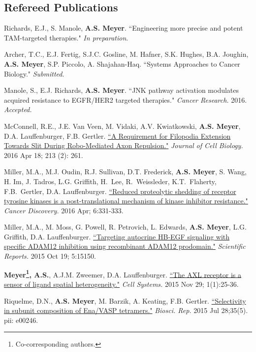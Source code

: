 \documentclass[11pt]{res}
\begin{document}
\begin{resume}
\section{Refereed Publications}
{ \leftskip 0.1in
\parindent -0.1in

Richards, E.J., S. Manole, {\bf A.S. Meyer}. ``Engineering more precise and potent TAM-targeted therapies." {\sl In preparation}.

\parskip 0.1in

Archer, T.C., E.J. Fertig, S.J.C. Gosline, M. Hafner, S.K. Hughes, B.A. Joughin, {\bf A.S. Meyer}, S.P. Piccolo, A. Shajahan-Haq. ``Systems Approaches to Cancer Biology." {\sl Submitted}.

Manole, S., E.J. Richards, {\bf A.S. Meyer}. ``JNK pathway activation modulates acquired resistance to EGFR/HER2 targeted therapies." {\sl Cancer Research.} 2016. {\sl Accepted.}

McConnell, R.E., J.E. Van Veen, M. Vidaki, A.V. Kwiatkowski, {\bf A.S. Meyer}, D.A. Lauffenburger, F.B. Gertler. \href{http://jcb.rupress.org/content/213/2/261.full}{``A Requirement for Filopodia Extension Towards Slit During Robo-Mediated Axon Repulsion."} {\sl Journal of Cell Biology.} 2016 Apr 18; 213 (2): 261.

Miller, M.A., M.J. Oudin, R.J. Sullivan, D.T. Frederick, {\bf A.S. Meyer}, S. Wang, H. Im, J. Tadros, L.G. Griffith, H. Lee, R. Weissleder, K.T. Flaherty, F.B. Gertler, D.A. Lauffenburger. \href{http://cancerdiscovery.aacrjournals.org/content/early/2016/03/15/2159-8290.CD-15-0933}{``Reduced proteolytic shedding of receptor tyrosine kinases is a post-translational mechanism of kinase inhibitor resistance."} {\sl Cancer Discovery.}  2016 Apr; 6:331-333.

Miller, M.A., M. Moss, G. Powell, R. Petrovich, L. Edwards, {\bf A.S. Meyer}, L.G. Griffith, D.A. Lauffenburger. \href{http://www.ncbi.nlm.nih.gov/pubmed/26477568}{``Targeting autocrine HB-EGF signaling with specific ADAM12 inhibition using recombinant ADAM12 prodomain."} {\sl Scientific Reports.} 2015 Oct 19; 5:15150.

{\bf Meyer\footnote{Co-corresponding authors.}, A.S.}, A.J.M. Zweemer, D.A. Lauffenburger\footnotemark[\value{footnote}]. \href{http://www.cell.com/cell-systems/abstract/S2405-4712(15)00007-1}{``The AXL receptor is a sensor of ligand spatial heterogeneity."} {\sl Cell Systems.} 2015 Nov 29; 1(1):25-36.

Riquelme, D.N., {\bf A.S. Meyer}, M. Barzik, A. Keating, F.B. Gertler. \href{http://www.ncbi.nlm.nih.gov/pubmed/26221026}{``Selectivity in subunit composition of Ena/VASP tetramers."} {\sl Biosci. Rep.} 2015 Jul 28;35(5). pii: e00246.

}
\end{resume}
\end{document}
